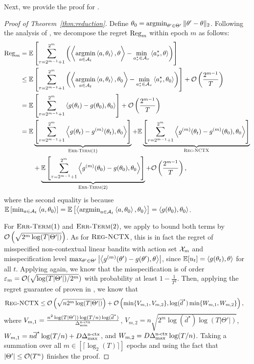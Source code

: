 Next, we provide the proof for .
\begin{proof}[Proof of Theorem~\ref{thm:reduction}]
    Define $\theta_0 = \operatorname*{argmin}_{\theta'\in \Theta'}\|\theta'-\theta\|_2$. 
    Following the analysis of \citet{hanna2023contexts}, we decompose the regret ${\mathrm{Reg}}_m$ within epoch $m$ as follows:
    \begin{align*}
        {\mathrm{Reg}}_m &=\mathbb{E}\left[\sum_{\tau=2^{m-1}+1}^{2^m}\left(\left\langle {\operatorname*{argmin}_{a\in{\mathcal{A}}_t} \left\langle {a,\theta_t} \right\rangle ,\theta} \right\rangle - \min_{a_\tau^\star\in{\mathcal{A}}_\tau}\left\langle {a_{\tau}^\star,\theta} \right\rangle\right)\right] \\
        &\leq \mathbb{E}\left[\sum_{\tau=2^{m-1}+1}^{2^m}\left(\left\langle {\operatorname*{argmin}_{a\in{\mathcal{A}}_t} \left\langle {a,\theta_t} \right\rangle ,\theta_0} \right\rangle - \min_{a_\tau^\star\in{\mathcal{A}}_\tau}\left\langle {a_{\tau}^\star,\theta_0} \right\rangle\right)\right] + \mathcal{O}\left(\frac{2^{m-1}}{T}\right)\\
        &= \mathbb{E}\left[\sum_{\tau=2^{m-1}+1}^{2^m}\left\langle {g(\theta_t)-g(\theta_0),\theta_0} \right\rangle\right] + \mathcal{O}\left(\frac{2^{m-1}}{T}\right)\\
        &= \mathbb{E}\underbrace{\left[\sum_{\tau=2^{m-1}+1}^{2^{m}}\left\langle {g(\theta_t)-g^{(m)}(\theta_t),\theta_0} \right\rangle\right]}_{\textsc{Err-Term}(1)}  + \mathbb{E}\underbrace{\left[\sum_{\tau=2^{m-1}+1}^{2^m}\left\langle {g^{(m)}(\theta_t)-g^{(m)}(\theta_0),\theta_0} \right\rangle\right]}_{\textsc{Reg-NCTX}} \\
        &\qquad + \underbrace{\mathbb{E}\left[\sum_{\tau=2^{m-1}+1}^{2^m}\left\langle {g^{(m)}(\theta_0)-g(\theta_0),\theta_0} \right\rangle\right]}_{\textsc{Err-Term}(2)} +\mathcal{O}\left(\frac{2^{m-1}}{T}\right),
    \end{align*}
    where the second equality is because
    $\mathbb{E}\left[\min_{a\in{\mathcal{A}}_t}\left\langle {a,\theta_0} \right\rangle\right] = \mathbb{E}\left[\left\langle {\operatorname*{argmin}_{a\in{\mathcal{A}}_t} \left\langle {a,\theta_0} \right\rangle ,\theta_0} \right\rangle\right] = \left\langle {g(\theta_0), \theta
    _0} \right\rangle$.
    
    For $\textsc{Err-Term}(1)$ and $\textsc{Err-Term}(2)$, we apply  to bound both terms  by $\mathcal{O}\left(\sqrt{2^m\log(T|\Theta'|)}\right)$.
    As for $\textsc{Reg-NCTX}$, this is in fact the regret of misspecified non-contextual linear bandits with action set ${\mathcal{X}}_m$ and misspecification level $\max_{\theta'\in \Theta'}\left|\left\langle {g^{(m)}(\theta')-g(\theta'),\theta} \right\rangle\right|$, since $\mathbb{E}[u_t]=\left\langle {g(\theta_t),\theta} \right\rangle$ for all $t$. Applying  again, we know that the misspecification is of order $\varepsilon_m=\mathcal{O}(\sqrt{\log(T|\Theta'|)/2^m})$ with probability at least $1-\frac{1}{T^2}$. 
    Then, applying the regret guarantee of  proven in , we know that
    \begin{align*}
        &\textsc{Reg-NCTX} 
        \leq \mathcal{O}\left(\sqrt{n2^m\log(T|\Theta'|)}\right)
        +\mathcal{O}\left(\min\{V_{m,1},V_{m,2}\},\log(\overline{d}^\star)\min\{W_{m,1},W_{m,2}\}\right),
    \end{align*}
    where $V_{m,1}=\frac{n^2\log(T|\Theta'|)\log(T/n)\log(\overline{d}^\star)}{\Delta_{\min}^{\text{n-ctx}}}$, $V_{m,2}=n\sqrt{2^m\log(\overline{d}^\star)\log(T|\Theta'|)}$, 
    $W_{m,1}=n\overline{d}^\star\log(T/n)+D\Delta_{\max}^{\text{n-ctx}}$, and $W_{m,2}=D\Delta_{\max}^{\text{n-ctx}}\log(T/n)$.
    Taking a summation over all $m\in[\lceil\log_2(T)\rceil]$ epochs and using the fact that $|\Theta'|\leq \mathcal{O}(T^n)$ finishes the proof.
\end{proof}